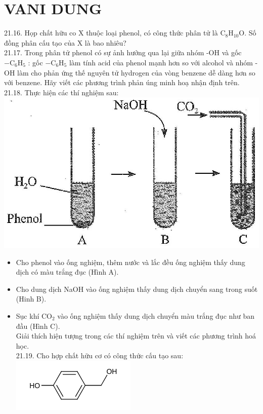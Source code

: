\documentclass[10pt]{article}
\begin{document}
\section*{VANI DUNG}
21.16. Họp chất hữu co X thuộc loại phenol, có công thức phân tử là $\mathrm{C}_{8} \mathrm{H}_{10} \mathrm{O}$. Số đồng phân cấu tạo của X là bao nhiêu?\\
21.17. Trong phân tử phenol có sự ảnh hưởng qua lại giữa nhóm -OH và gốc $-\mathrm{C}_{6} \mathrm{H}_{5}$ : gốc $-\mathrm{C}_{6} \mathrm{H}_{5}$ làm tính acid của phenol mạnh hơn so với alcohol và nhóm -OH làm cho phản ứng thế nguyên tử hydrogen của vòng benzene dễ dàng hơn so với benzene. Hãy viết các phương trình phản úng minh hoạ nhận định trên.\\
21.18. Thực hiện các thí nghiệm sau:\\
\includegraphics[max width=\textwidth, center]{2025_10_23_fa9073eecee116ad8cf2g-73}

\begin{itemize}
  \item Cho phenol vào ống nghiệm, thêm nước và lắc đều ống nghiệm thấy dung dịch có màu trắng đục (Hình A).
  \item Cho dung dịch NaOH vào ống nghiệm thấy dung dịch chuyển sang trong suốt (Hinh B).
  \item Sục khí $\mathrm{CO}_{2}$ vào ống nghiệm thấy dung dịch chuyển màu trắng đục như ban đầu (Hình C).\\
Giải thích hiện tượng trong các thí nghiệm trên và viết các phương trình hoá học.\\
21.19. Cho hợp chất hữu cơ có công thức cấu tạo sau:\\
\includegraphics{smile-d56935e7dd2f5464901a09b5bce7dec35da861b0}
\end{itemize}
\end{document}
